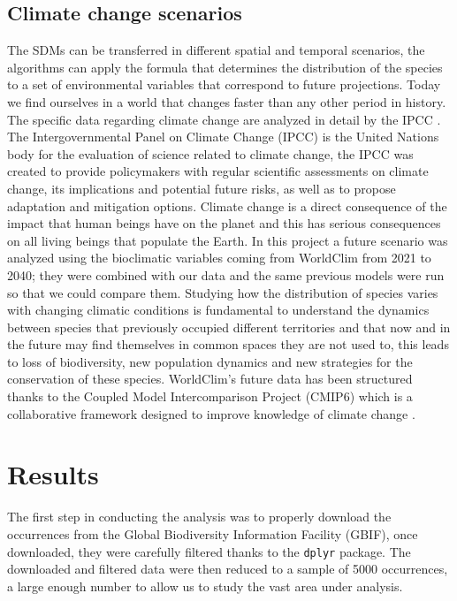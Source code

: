 \documentclass[12pt,a4paper]{article}
\begin{document}
\subsection{Climate change scenarios}
The SDMs can be transferred in different spatial and temporal scenarios, the algorithms can apply the formula that determines the distribution of the species to a set of environmental variables that correspond to future projections.
Today we find ourselves in a world that changes faster than any other period in history.    
The specific data regarding climate change are analyzed in detail by the IPCC \citep{ipcc}.
The Intergovernmental Panel on Climate Change (IPCC) is the United Nations body for the evaluation of science related to climate change, the IPCC was created to provide policymakers with regular scientific assessments on climate change, its implications and potential future risks, as well as to propose adaptation and mitigation options\citep{ipcc}.
Climate change is a direct consequence of the impact that human beings have on the planet and this has serious consequences on all living beings that populate the Earth.
In this project a future scenario was analyzed using the bioclimatic variables coming from WorldClim \citep{cmi} from 2021 to 2040; they were combined with our data and the same previous models were run so that we could compare them.
Studying how the distribution of species varies with changing climatic conditions is fundamental to understand the dynamics between species that previously occupied different territories and that now and in the future may find themselves in common spaces they are not used to, this leads to loss of biodiversity, new population dynamics and new strategies for the conservation of these species.
WorldClim's future data has been structured thanks to the Coupled Model Intercomparison Project (CMIP6) which is a collaborative framework designed to improve knowledge of climate change \citep{CMIP6}.


\section{Results}
The first step in conducting the analysis was to properly download the occurrences from the Global Biodiversity Information Facility (GBIF), once downloaded, they were carefully filtered thanks to the \texttt{dplyr} package. 
The downloaded and filtered data were then reduced to a sample of 5000 occurrences, a large enough number to allow us to study the vast area under analysis.
\end{document}
